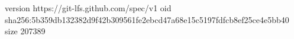 version https://git-lfs.github.com/spec/v1
oid sha256:5b359db132382d9f42b309561fe2ebcd47a68e15c5197fdfcb8ef25ce4e5bb40
size 207389
